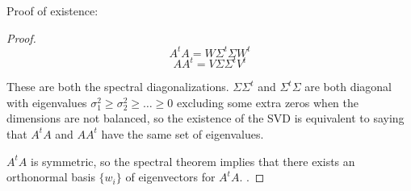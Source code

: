 Proof of existence:
\begin{proof}
\[A^tA = W\Sigma^t \Sigma W^t\]
\[AA^t = V\Sigma \Sigma^t V^t\]

These are both the spectral diagonalizations. $\Sigma \Sigma^t$ and $\Sigma^t\Sigma$ are both diagonal with eigenvalues $\sigma_1^2\geq \sigma_2^2\geq \hdots\geq 0$ excluding some extra zeros when the dimensions are not balanced, so the existence of the SVD is equivalent to saying that $A^tA$ and $AA^t$ have the same set of eigenvalues. 

$A^tA$ is symmetric, so the spectral theorem implies that there exists an orthonormal basis $\{w_i\}$ of eigenvectors for $A^tA$. . 
\end{proof}

